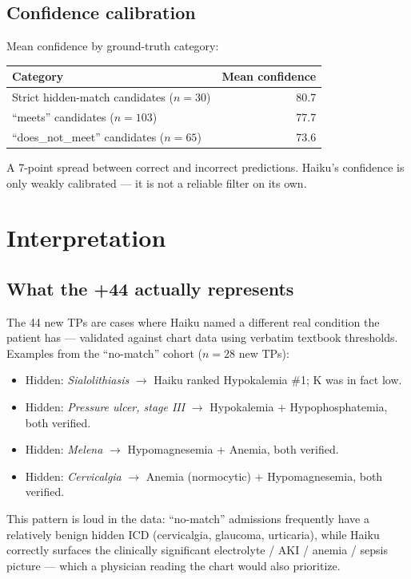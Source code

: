 \documentclass[11pt]{article}
\begin{document}
\subsection{Confidence calibration}
Mean confidence by ground-truth category:
\begin{center}
\begin{tabular}{lr}
\toprule
Category & Mean confidence \\
\midrule
Strict hidden-match candidates ($n=30$) & 80.7 \\
``meets'' candidates ($n=103$) & 77.7 \\
``does\_not\_meet'' candidates ($n=65$) & 73.6 \\
\bottomrule
\end{tabular}
\end{center}

A 7-point spread between correct and incorrect predictions. Haiku's confidence is only
weakly calibrated --- it is not a reliable filter on its own.

\section{Interpretation}
\subsection{What the +44 actually represents}
The 44 new TPs are cases where Haiku named a different real condition the patient
has --- validated against chart data using verbatim textbook thresholds. Examples from
the ``no-match'' cohort ($n=28$ new TPs):

\begin{itemize}[leftmargin=*,nosep]
\item Hidden: \emph{Sialolithiasis} $\rightarrow$ Haiku ranked Hypokalemia \#1; K was in fact low.
\item Hidden: \emph{Pressure ulcer, stage III} $\rightarrow$ Hypokalemia + Hypophosphatemia, both verified.
\item Hidden: \emph{Melena} $\rightarrow$ Hypomagnesemia + Anemia, both verified.
\item Hidden: \emph{Cervicalgia} $\rightarrow$ Anemia (normocytic) + Hypomagnesemia, both verified.
\end{itemize}

This pattern is loud in the data: ``no-match'' admissions frequently have a relatively
benign hidden ICD (cervicalgia, glaucoma, urticaria), while Haiku correctly surfaces the
clinically significant electrolyte / AKI / anemia / sepsis picture --- which a physician
reading the chart would also prioritize.
\end{document}

